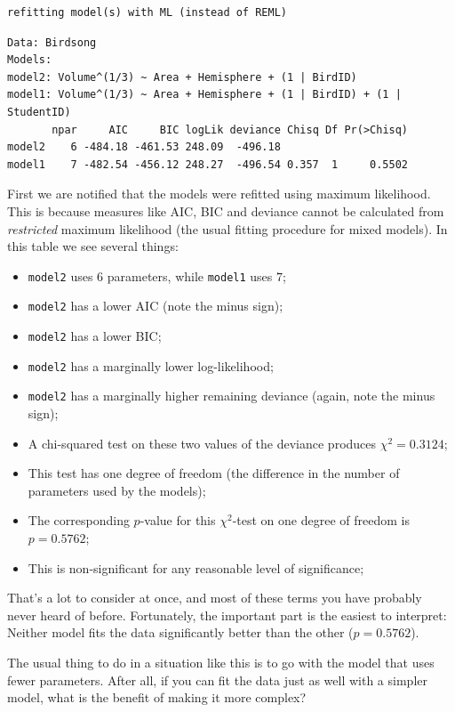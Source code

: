 \documentclass[
]{book}
\providecommand{\tightlist}{%
  \setlength{\itemsep}{0pt}\setlength{\parskip}{0pt}}
\begin{document}
\begin{verbatim}
refitting model(s) with ML (instead of REML)
\end{verbatim}

\begin{verbatim}
Data: Birdsong
Models:
model2: Volume^(1/3) ~ Area + Hemisphere + (1 | BirdID)
model1: Volume^(1/3) ~ Area + Hemisphere + (1 | BirdID) + (1 | StudentID)
       npar     AIC     BIC logLik deviance Chisq Df Pr(>Chisq)
model2    6 -484.18 -461.53 248.09  -496.18                    
model1    7 -482.54 -456.12 248.27  -496.54 0.357  1     0.5502
\end{verbatim}

First we are notified that the models were refitted using maximum likelihood. This is because measures like AIC, BIC and deviance cannot be calculated from \emph{restricted} maximum likelihood (the usual fitting procedure for mixed models). In this table we see several things:

\begin{itemize}
\tightlist
\item
  \texttt{model2} uses \(6\) parameters, while \texttt{model1} uses \(7\);
\item
  \texttt{model2} has a lower AIC (note the minus sign);
\item
  \texttt{model2} has a lower BIC;
\item
  \texttt{model2} has a marginally lower log-likelihood;
\item
  \texttt{model2} has a marginally higher remaining deviance (again, note the minus sign);
\item
  A chi-squared test on these two values of the deviance produces \(\chi^2 = 0.3124\);
\item
  This test has one degree of freedom (the difference in the number of parameters used by the models);
\item
  The corresponding \(p\)-value for this \(\chi^2\)-test on one degree of freedom is \(p = 0.5762\);
\item
  This is non-significant for any reasonable level of significance;
\end{itemize}

That's a lot to consider at once, and most of these terms you have probably never heard of before. Fortunately, the important part is the easiest to interpret: Neither model fits the data significantly better than the other (\(p = 0.5762\)).

The usual thing to do in a situation like this is to go with the model that uses fewer parameters. After all, if you can fit the data just as well with a simpler model, what is the benefit of making it more complex?
\end{document}
